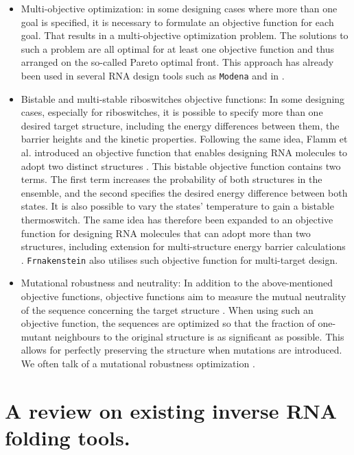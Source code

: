 \begin{itemize}
\item Multi-objective optimization: in some designing cases where more than one goal is specified, it is necessary to formulate an objective function for each goal. That results in a multi-objective optimization problem. The solutions to such a problem are all optimal for at least one objective function and thus arranged on the so-called Pareto optimal front. This approach has already been used in several RNA design tools such as \texttt{Modena} \cite{modena_2012, taneda2015multi} and in \cite{ramlan2011design}.

\item Bistable and multi-stable riboswitches objective functions: In some designing cases, especially for riboswitches, it is possible to specify more than one desired target structure, including the energy differences between them, the barrier heights and the kinetic properties. Following the same idea, Flamm et al. introduced an objective function that enables designing RNA molecules to adopt two distinct structures \cite{flamm2001design}. This bistable objective function contains two terms. The first term increases the probability of both structures in the ensemble, and the second specifies the desired energy difference between both states. It is also possible to vary the states' temperature to gain a bistable thermoswitch. The same idea has therefore been expanded to an objective function for designing RNA molecules that can adopt more than two structures, including extension for multi-structure energy barrier calculations \cite{ramlan2011design, shu2010ardesigner}.  \texttt{Frnakenstein} \cite{lyngso2012frnakenstein} also utilises such objective function for multi-target design.

\item Mutational robustness and neutrality: In addition to the above-mentioned objective functions, objective functions aim to measure the mutual neutrality of the sequence concerning the target structure \cite{shu2010ardesigner}. When using such an objective function, the sequences are optimized so that the fraction of one-mutant neighbours to the original structure is as significant as possible. This allows for perfectly preserving the structure when mutations are introduced. We often talk of a mutational robustness optimization \cite{avihoo2011rnaexinv}.
	
\end{itemize}

\section{A review on existing inverse RNA folding tools.}

